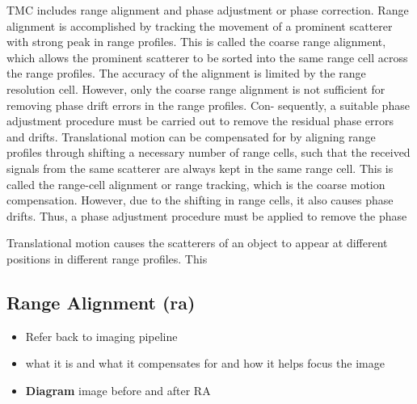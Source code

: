 \documentclass[class=report,11pt,crop=false]{standalone}
\begin{document}
TMC includes range alignment and phase adjustment or phase correction. Range alignment is accomplished by tracking the movement of a prominent scatterer with strong peak in range profiles. This is called the coarse range alignment, which allows the prominent scatterer to be sorted into the same range cell across the range profiles. The accuracy of the alignment is limited by the range resolution cell. However, only the coarse range alignment is not sufficient for removing phase drift errors in the range profiles. Con- sequently, a suitable phase adjustment procedure must be carried out to remove the residual phase errors and drifts.
Translational motion can be compensated for by aligning range profiles through shifting a necessary number of range cells, such that the received signals from the same scatterer are always kept in the same range cell. This is called the range-cell alignment or range tracking, which is the coarse motion compensation. However, due to the shifting in range cells, it also causes phase drifts. Thus, a phase adjustment procedure must be applied to remove the phase

Translational motion causes the scatterers of an object to appear at different positions in different range profiles. This 

    \subsection{Range Alignment (\gls{ra})}
    \begin{itemize}
        \item Refer back to imaging pipeline
        \item what it is and what it compensates for and how it helps focus the image
        \item \textbf{Diagram} image before and after RA
    \end{itemize}
\end{document}
